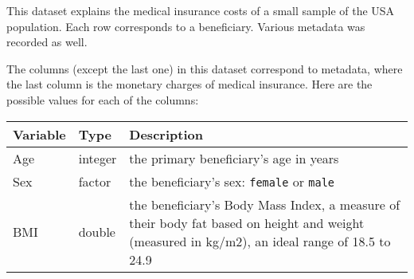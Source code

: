\documentclass[
]{article}
\begin{document}
This dataset explains the medical insurance costs of a small sample of the USA population. Each row corresponds to a beneficiary. Various metadata was recorded as well.

The columns (except the last one) in this dataset correspond to metadata, where the last column is the monetary charges of medical insurance. Here are the possible values for each of the columns:

\begin{longtable}[]{@{}lll@{}}
\toprule
\begin{minipage}[b]{0.27\columnwidth}\raggedright
Variable\strut
\end{minipage} & \begin{minipage}[b]{0.18\columnwidth}\raggedright
Type\strut
\end{minipage} & \begin{minipage}[b]{0.46\columnwidth}\raggedright
Description\strut
\end{minipage}\tabularnewline
\midrule
\endhead
\begin{minipage}[t]{0.27\columnwidth}\raggedright
Age\strut
\end{minipage} & \begin{minipage}[t]{0.18\columnwidth}\raggedright
integer\strut
\end{minipage} & \begin{minipage}[t]{0.46\columnwidth}\raggedright
the primary beneficiary's age in years\strut
\end{minipage}\tabularnewline
\begin{minipage}[t]{0.27\columnwidth}\raggedright
Sex\strut
\end{minipage} & \begin{minipage}[t]{0.18\columnwidth}\raggedright
factor\strut
\end{minipage} & \begin{minipage}[t]{0.46\columnwidth}\raggedright
the beneficiary's sex: \texttt{female} or \texttt{male}\strut
\end{minipage}\tabularnewline
\begin{minipage}[t]{0.27\columnwidth}\raggedright
BMI\strut
\end{minipage} & \begin{minipage}[t]{0.18\columnwidth}\raggedright
double\strut
\end{minipage} & \begin{minipage}[t]{0.46\columnwidth}\raggedright
the beneficiary's Body Mass Index, a measure of their body fat based on height and weight (measured in kg/m2), an ideal range of 18.5 to 24.9\strut

\end{minipage}
\end{longtable}
\end{document}

